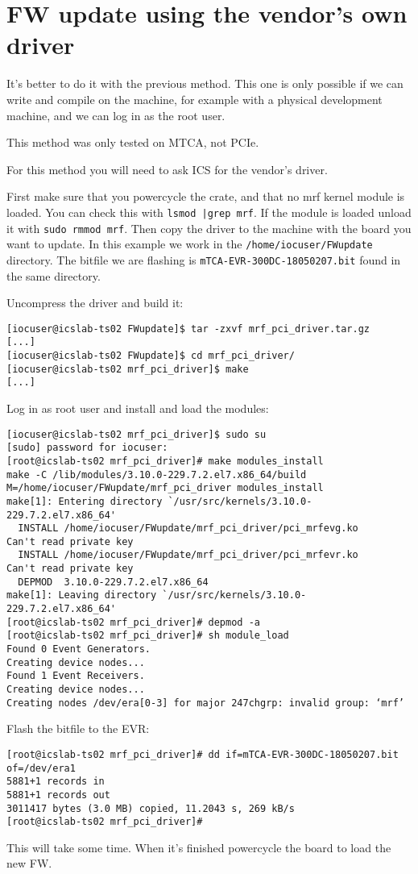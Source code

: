 \documentclass[11pt
  , a4paper
  , article
  , oneside
  , showtrims
]{memoir}
\begin{document}
\clearpage
\section{FW update using the vendor's own driver}
It's better to do it with the previous method. This one is only possible if we can write and compile on the machine, for example with a physical development machine, and we can log in as the root user.

This method was only tested on MTCA, not PCIe.

For this method you will need to ask ICS for the vendor's driver.

First make sure that you powercycle the crate, and that no mrf kernel module is loaded. You can check this with \texttt{lsmod |grep mrf}. If the module is loaded unload it with \texttt{sudo rmmod mrf}. Then copy the driver to the machine with the board you want to update. In this example we work in the \texttt{/home/iocuser/FWupdate} directory. The bitfile we are flashing is \texttt{mTCA-EVR-300DC-18050207.bit} found in the same directory.

Uncompress the driver and build it:
\begin{lstlisting}[style=termstyle]
[iocuser@icslab-ts02 FWupdate]$ tar -zxvf mrf_pci_driver.tar.gz
[...]
[iocuser@icslab-ts02 FWupdate]$ cd mrf_pci_driver/
[iocuser@icslab-ts02 mrf_pci_driver]$ make
[...]
\end{lstlisting}
Log in as root user and install and load the modules:
\begin{lstlisting}[style=termstyle]
[iocuser@icslab-ts02 mrf_pci_driver]$ sudo su
[sudo] password for iocuser:
[root@icslab-ts02 mrf_pci_driver]# make modules_install
make -C /lib/modules/3.10.0-229.7.2.el7.x86_64/build M=/home/iocuser/FWupdate/mrf_pci_driver modules_install
make[1]: Entering directory `/usr/src/kernels/3.10.0-229.7.2.el7.x86_64'
  INSTALL /home/iocuser/FWupdate/mrf_pci_driver/pci_mrfevg.ko
Can't read private key
  INSTALL /home/iocuser/FWupdate/mrf_pci_driver/pci_mrfevr.ko
Can't read private key
  DEPMOD  3.10.0-229.7.2.el7.x86_64
make[1]: Leaving directory `/usr/src/kernels/3.10.0-229.7.2.el7.x86_64'
[root@icslab-ts02 mrf_pci_driver]# depmod -a
[root@icslab-ts02 mrf_pci_driver]# sh module_load
Found 0 Event Generators.
Creating device nodes...
Found 1 Event Receivers.
Creating device nodes...
Creating nodes /dev/era[0-3] for major 247chgrp: invalid group: ‘mrf’
\end{lstlisting}
Flash the bitfile to the EVR:
\begin{lstlisting}[style=termstyle]
[root@icslab-ts02 mrf_pci_driver]# dd if=mTCA-EVR-300DC-18050207.bit of=/dev/era1
5881+1 records in
5881+1 records out
3011417 bytes (3.0 MB) copied, 11.2043 s, 269 kB/s
[root@icslab-ts02 mrf_pci_driver]#
\end{lstlisting}
This will take some time. When it's finished powercycle the board to load the new FW.
\end{document}
